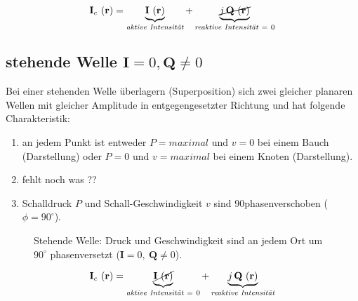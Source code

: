\begin{equation}
	\mathbf{I}_c ~(\mathbf{r}) = \underbrace{\mathbf{I}~(\mathbf{r})}_{\textit{aktive Intensität}} + \underbrace{ \cancel{j\,\mathbf{Q}~(\mathbf{r})}}_{\textit{reaktive~Intensität}~=~0}
	\label{helmholtz:equationIntensitaetComplexplanar}
\end{equation}	


\subsection{stehende Welle $\mathbf{I} = 0,\mathbf{Q} \neq 0$
\label{helmholtz:subsection:stehendeWelle}}

Bei einer stehenden Welle überlagern (Superposition) sich zwei gleicher planaren Wellen mit gleicher Amplitude in entgegengesetzter Richtung und hat folgende Charakteristik:

\begin{enumerate}
\item an jedem Punkt ist entweder  $P = maximal$ und $v = 0$ bei einem Bauch (Darstellung) oder $P = 0$  und $ v = maximal$ bei einem Knoten (Darstellung).
\item fehlt noch was ??
\item Schalldruck $P$ und Schall-Geschwindigkeit $v$ sind 90\textdegree phasenverschoben ($\phi = 90^{\circ}$).
\end{enumerate}

\begin{figure}
\centering
{}
\caption{Stehende Welle: Druck und Geschwindigkeit sind an jedem Ort um $90^\circ$ phasenversetzt ($\mathbf I=0,\ \mathbf Q\neq0$).}
\end{figure}

\begin{equation}
	\mathbf{I}_c ~(\mathbf{r}) = \underbrace{\cancel{\mathbf{I}~(\mathbf{r})}}_{\textit{aktive Intensität}~=~0} + \underbrace{j\,\mathbf{Q}~(\mathbf{r})}_{\textit{reaktive~Intensität}}
	\label{helmholtz:equationIntensitaetComplexStehend}
\end{equation}	